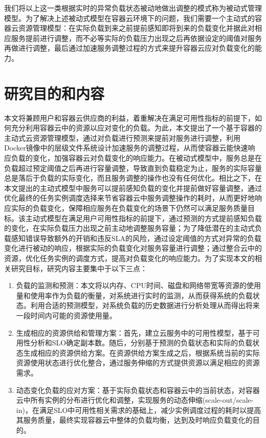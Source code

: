 我们将以上这一类根据实时的异常负载状态被动地做出调整的模式称为被动式管理模型。为了解决上述被动式模型在容器云环境下的问题，我们需要一个主动式的容器云资源管理模型：在实际负载到来之前提前感知即将到来的负载变化并据此对相应服务提前进行调整，而不必等实际的负载压力出现之后再依据设定的阈值对服务再做进行调整，最后通过加速服务调整过程的方式来提升容器云应对负载变化的能力。

\section{研究目的和内容}
本文将兼顾用户和容器云供应商的利益，着重解决在满足可用性指标的前提下，如何充分利用容器云中的资源以应对变化的负载。为此，本文提出了一个基于容器的主动式云资源管理模型，通过对负载进行预测来提前对服务进行调整，利用Docker镜像中的层级文件系统设计加速服务的调整过程，从而使容器云能快速响应负载的变化，加强容器云对负载变化的响应能力。在被动式模型中，服务总是在负载超过预定阈值之后再进行容量调整，导致直到负载稳定为止，服务的实际容量总是落后于负载的实际变化，而且服务调整的操作也没有任何优化。相比之下，在本文提出的主动式模型中服务可以提前感知负载的变化并提前做好容量调整，通过优化最终的任务实例调度选择来节省容器云中服务调整操作的耗时，从而更好地响应实际的负载变化，保障相应服务在负载变化的场景下仍然可以满足服务质量目标。该主动式模型在满足用户可用性指标的前提下，通过预测的方式提前感知负载的变化，在实际负载压力出现之前主动地调整服务容量；为了降低潜在的主动式负载感知错误导致额外的开销和违反SLA的风险，通过设定阈值的方式对异常的负载变化进行被动的响应，根据实际的负载变化对服务容量进行调整；通过整合云中的资源，优化任务实例的调度方式，提高对负载变化的响应能力。为了实现本文的相关研究目标，研究内容主要集中于以下三点：
\begin{enumerate}
\item 负载的监测和预测：本文将以内存、CPU时间、磁盘和网络带宽等资源的使用量和使用率作为负载的衡量，对系统进行实时的监测，从而获得系统的负载状态。利用合适的预测模型，对系统负载的历史数据进行分析处理从而得出将来一段时间内可能的资源使用量。
\item 生成相应的资源供给和管理方案：首先，建立云服务中的可用性模型，基于可用性分析和SLO确定副本数。随后，分别基于预测的负载状态和实际的负载状态生成相应的资源供给方案。在资源供给方案生成之后，根据系统当前的实际资源使用状态进行优化整合，通过服务伸缩的方式提供资源以满足相应的资源需求。
\item 动态变化负载的应对方案：基于实际负载状态和容器云中的当前状态，对容器云中所有实例的分布进行优化和调整，实现服务的动态伸缩(scale-out/scale-in)，在满足SLO中可用性相关需求的基础上，减少实例调度过程的耗时以提高其服务质量，最终实现容器云中整体的负载均衡，达到及时响应负载变化的目的。
\end{enumerate}

